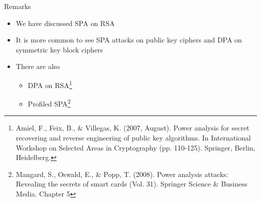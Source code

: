 \begin{frame}{Remarks}
    \begin{itemize}
        \item We have discussed SPA on RSA
        \item It is more common to see SPA attacks on public key ciphers and DPA on symmetric key block ciphers
        \item There are also
        \begin{itemize}
            \item DPA on RSA\footnote{Amiel, F., Feix, B., \& Villegas, K. (2007, August). Power analysis for secret recovering and reverse engineering of public key algorithms. In International Workshop on Selected Areas in Cryptography (pp. 110-125). Springer, Berlin, Heidelberg.}
            \item Profiled SPA\footnote{Mangard, S., Oswald, E., \& Popp, T. (2008). Power analysis attacks: Revealing the secrets of smart cards (Vol. 31). Springer Science \& Business Media. Chapter 5}
        \end{itemize}
    \end{itemize}
\end{frame}